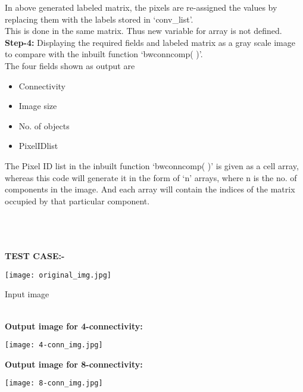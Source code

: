 \documentclass{report}
\begin{document}
\noindent In above generated labeled matrix, the pixels are re-assigned the values by replacing them
with the labels stored in ‘conv\_list’.\\
This is done in the same matrix. Thus new variable for array is not defined.\\

\noindent \textbf{Step-4:} Displaying the required fields and labeled matrix as a gray scale image to compare with the inbuilt function ‘bwconncomp( )’.\\

The four fields shown as output are
\begin{itemize}
\item Connectivity
\item Image size
\item No. of objects
\item PixelIDlist
\end{itemize}

\noindent The Pixel ID list in the inbuilt function ‘bwconncomp( )’ is given as a cell array, whereas
this code will generate it in the form of ‘n’ arrays, where n is the no. of components in the
image. And each array will contain the indices of the matrix occupied by that particular
component.

\begin{itemize}
\end{itemize}

\\
\\
\\
\clearpage
\noindent \textbf{TEST CASE:-}\\
\begin{graphics}
\begin{center}
\texttt{[image: original\_img.jpg]}
\end{center}
\begin{center}
\begin{caption}
\caption{Input image}
\end{caption}
\end{center}
\end{graphics}\\
\noindent \textbf{Output image for 4-connectivity:}\\
\begin{graphics}
\begin{center}
\texttt{[image: 4-conn\_img.jpg]}\\
\end{center}
\end{graphics}
\clearpage
\noindent \textbf{Output image for 8-connectivity:}\\
\begin{graphics}
\begin{center}
\texttt{[image: 8-conn\_img.jpg]}
\end{center}
\end{graphics}
\end{document}
